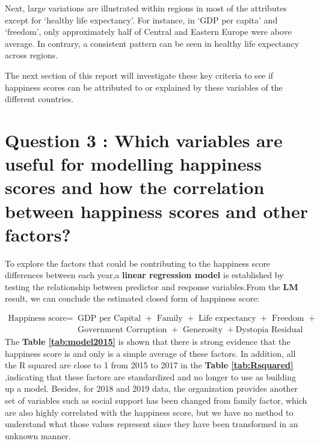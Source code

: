 \documentclass[11pt,a4paper,]{article}
\begin{document}
Next, large variations are illustrated within regions in most of the attributes except for `healthy life expectancy'. For instance, in `GDP per capita' and `freedom', only approximately half of Central and Eastern Europe were above average. In contrary, a consistent pattern can be seen in healthy life expectancy across regions.

The next section of this report will investigate these key criteria to see if happiness scores can be attributed to or explained by these variables of the different countries.

\clearpage

\hypertarget{question-3-which-variables-are-useful-for-modelling-happiness-scores-and-how-the-correlation-between-happiness-scores-and-other-factors}{%
\section{Question 3 : Which variables are useful for modelling happiness scores and how the correlation between happiness scores and other factors?}\label{question-3-which-variables-are-useful-for-modelling-happiness-scores-and-how-the-correlation-between-happiness-scores-and-other-factors}}

To explore the factors that could be contributing to the happiness score differences between each year,a \textbf{linear regression model} is established by testing the relationship between predictor and response variables.From the \textbf{LM} result, we can conclude the estimated closed form of happiness score:

\begin{align*}
\text{Happiness score} = & \text{ GDP per Capital } + \text{ Family } + \text{ Life expectancy }+ \text{ Freedom } +   \\ 
&  \text{ Government Corruption } + \text{ Generosity } + \text{Dystopia Residual }
\end{align*}
The \textbf{Table \ref{tab:model2015}} is shown that there is strong evidence that the happiness score is and only is a simple average of these factors. In addition, all the R squared are close to 1 from 2015 to 2017 in the \textbf{Table \ref{tab:Rsquared}} ,indicating that these factors are standardized and no longer to use as building up a model. Besides, for 2018 and 2019 data, the organization provides another set of variables such as social support has been changed from family factor, which are also highly correlated with the happiness score, but we have no method to understand what those values represent since they have been transformed in an unknown manner.
\end{document}

